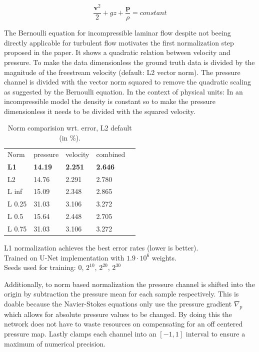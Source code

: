 \documentclass[acmtog]{techreportacmart}
\begin{document}
\begin{equation}
\label{eqn:00}
	\frac{\textbf{v}^2}{2} + gz + \frac{\textbf{p}}{\rho} = constant
\end{equation}

The Bernoulli equation for incompressible laminar flow despite not beeing directly applicable for turbulent flow
motivates the first normalization step proposed in the paper. It shows a quadratic relation between velocity and
pressure. To make the data dimensionless the ground truth data is divided by the magnitude of the freestream 
velocity (default: L2 vector norm). The pressure channel is divided with the vector norm squared to remove the 
quadratic scaling as suggested by the Bernoulli equation.
In the context of physical units: In an incompressible model the density is constant so to make the 
pressure dimensionless it needs to be divided with the squared velocity. \\

\begin{table}
\caption{Norm comparision wrt. error, L2 default (in \%).}
\label{tab:one}
\begin{center}
\begin{tabular}{l|l|l|l|l}
  \toprule
  Norm   & pressure   &	velocity    & combined \\
  \bf L1	 & \bf 14.19	  & \bf 2.251		& \bf 2.646    \\
  L2	 & 14.76	  & 2.291		& 2.780	   \\
  L inf	 & 15.09	  & 2.348		& 2.865	   \\
  L 0.25 & 31.03	  & 3.106		& 3.272	   \\
  L 0.5  & 15.64	  & 2.448		& 2.705	   \\
  L 0.75 & 31.03	  & 3.106		& 3.272	   \\	
  \bottomrule
\end{tabular}
\end{center}
\bigskip\centering
\footnotesize L1 normalization achieves the best error rates (lower is better). \\
Trained on \cite{Thuerey20} U-Net implementation with $1.9 \cdot 10^{6}$ weights. \\
Seeds used for training: $0$, $2^{10}$, $2^{20}$, $2^{30}$
\end{table}%

Additionally, to norm based normalization the pressure channel is shifted into the origin 
by subtraction the pressure mean for each sample respectively. This is doable because the 
Navier-Stokes equations only use the pressure gradient $\nabla_p$ which allows for absolute pressure
values to be changed. By doing this the network does not have to waste resources on 
compensating for an off centered pressure map. Lastly \cite{Thuerey20} clamps each channel 
into an $[-1, 1]$ interval to ensure a maximum of numerical precision.
\end{document}
